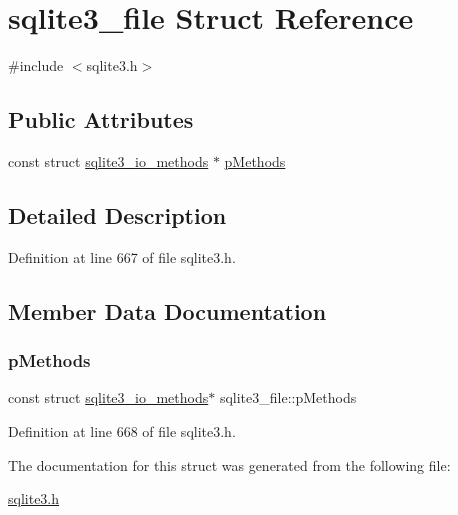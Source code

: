 \hypertarget{structsqlite3__file}{}\section{sqlite3\+\_\+file Struct Reference}
\label{structsqlite3__file}


{\ttfamily \#include $<$sqlite3.\+h$>$}

\subsection*{Public Attributes}
\begin{DoxyCompactItemize}
\item 
const struct \mbox{\hyperlink{structsqlite3__io__methods}{sqlite3\+\_\+io\+\_\+methods}} $\ast$ \mbox{\hyperlink{structsqlite3__file_adfc58b2d7514112375d7330e2881bc70}{p\+Methods}}
\end{DoxyCompactItemize}


\subsection{Detailed Description}


Definition at line 667 of file sqlite3.\+h.



\subsection{Member Data Documentation}
\mbox{\label{structsqlite3__file_adfc58b2d7514112375d7330e2881bc70}} 
\subsubsection{\texorpdfstring{p\+Methods}{pMethods}}
{\footnotesize\ttfamily const struct \mbox{\hyperlink{structsqlite3__io__methods}{sqlite3\+\_\+io\+\_\+methods}}$\ast$ sqlite3\+\_\+file\+::p\+Methods}



Definition at line 668 of file sqlite3.\+h.



The documentation for this struct was generated from the following file\+:\begin{DoxyCompactItemize}
\item 
\mbox{\hyperlink{sqlite3_8h}{sqlite3.\+h}}\end{DoxyCompactItemize}
